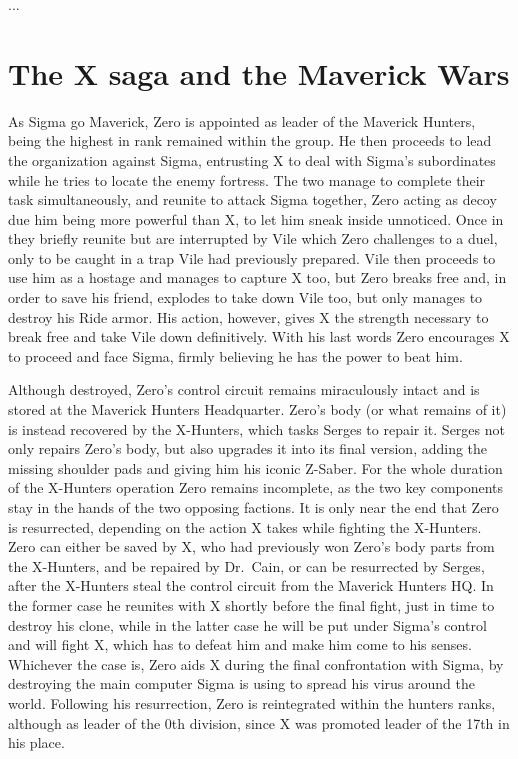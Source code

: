 ...

\section{The X saga and the Maverick Wars}
As Sigma go Maverick, Zero is appointed as leader of the Maverick Hunters, being the highest in rank remained within the group. He then proceeds to lead the organization against Sigma, entrusting X to deal with Sigma's subordinates while he tries to locate the enemy fortress. The two manage to complete their task simultaneously, and reunite to attack Sigma together, Zero acting as decoy due him being more powerful than X, to let him sneak inside unnoticed. Once in they briefly reunite but are interrupted by Vile which Zero  challenges to a duel, only to be caught in a trap Vile had previously prepared. Vile then proceeds to use him as a hostage and manages to capture X too, but Zero breaks free and, in order to save his friend, explodes to take down Vile too, but only manages to destroy his Ride armor. His action, however, gives X the strength necessary to break free and take Vile down definitively. With his last words Zero encourages X to proceed and face Sigma, firmly believing he has the power to beat him.

Although destroyed, Zero's control circuit remains miraculously intact and is stored at the Maverick Hunters Headquarter. Zero's body (or what remains of it) is instead recovered by the X-Hunters, which tasks Serges to repair it. Serges not only repairs Zero's body, but also upgrades it into its final version, adding the missing shoulder pads and giving him his iconic Z-Saber. For the whole duration of the X-Hunters operation Zero remains incomplete, as the two key components stay in the hands of the two opposing factions. It is only near the end that Zero is resurrected, depending on the action X takes while fighting the X-Hunters. Zero can either be saved by X, who had previously won Zero's body parts from the X-Hunters, and be repaired by Dr.~Cain, or can be resurrected by Serges, after the X-Hunters steal the control circuit from the Maverick Hunters HQ. In the former case he reunites with X shortly before the final fight, just in time to destroy his clone, while in the latter case he will be put under Sigma's control and will fight X, which has to defeat him and make him come to his senses. Whichever the case is, Zero aids X during the final confrontation with Sigma, by destroying the main computer Sigma is using to spread his virus around the world. Following his resurrection, Zero is reintegrated within the hunters ranks, although as leader of the 0th division, since X was promoted leader of the 17th in his place. 

